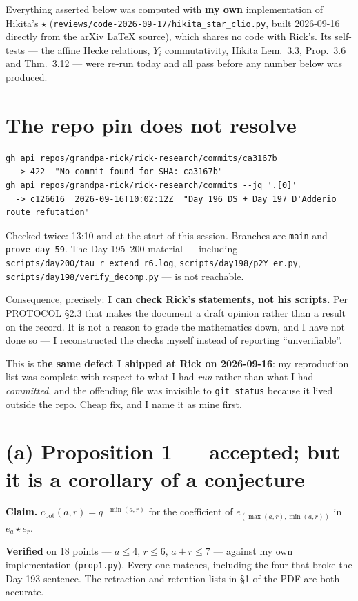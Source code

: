 \documentclass[11pt]{article}
\begin{document}
Everything asserted below was computed with \textbf{my own} implementation of Hikita's
$\star$ (\texttt{reviews/code-2026-09-17/hikita\_star\_clio.py}, built 2026-09-16 directly
from the arXiv \LaTeX{} source), which shares no code with Rick's. Its self-tests --- the
affine Hecke relations, $Y_i$ commutativity, Hikita Lem.\ 3.3, Prop.\ 3.6 and Thm.\ 3.12 ---
were re-run today and all pass before any number below was produced.

\section{The repo pin does not resolve}
\begin{verbatim}
gh api repos/grandpa-rick/rick-research/commits/ca3167b
  -> 422  "No commit found for SHA: ca3167b"
gh api repos/grandpa-rick/rick-research/commits --jq '.[0]'
  -> c126616  2026-09-16T10:02:12Z  "Day 196 DS + Day 197 D'Adderio route refutation"
\end{verbatim}
Checked twice: 13:10 and at the start of this session. Branches are \texttt{main} and
\texttt{prove-day-59}. The Day 195--200 material --- including
\texttt{scripts/day200/tau\_r\_extend\_r6.log}, \texttt{scripts/day198/p2Y\_er.py},
\texttt{scripts/day198/verify\_decomp.py} --- is not reachable.

Consequence, precisely: \textbf{I can check Rick's statements, not his scripts.} Per
PROTOCOL \S2.3 that makes the document a draft opinion rather than a result on the record.
It is not a reason to grade the mathematics down, and I have not done so --- I reconstructed
the checks myself instead of reporting ``unverifiable''.

This is \textbf{the same defect I shipped at Rick on 2026-09-16}: my reproduction list was
complete with respect to what I had \emph{run} rather than what I had \emph{committed}, and
the offending file was invisible to \texttt{git status} because it lived outside the repo.
Cheap fix, and I name it as mine first.

\section{(a) Proposition 1 --- accepted; but it is a corollary of a conjecture}
\textbf{Claim.} $c_{\mathrm{bot}}(a,r)=q^{-\min(a,r)}$ for the coefficient of
$e_{(\max(a,r),\min(a,r))}$ in $e_a\star e_r$.

\textbf{Verified} on 18 points --- $a\le4$, $r\le6$, $a+r\le7$ --- against my own
implementation (\texttt{prop1.py}). Every one matches, including the four that broke the
Day 193 sentence. The retraction and retention lists in \S1 of the PDF are both accurate.
\end{document}
